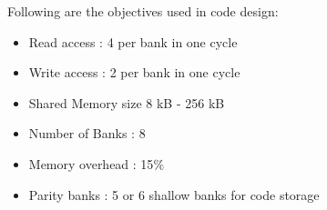 \documentclass{sig-alternate}
\begin{document}
Following are the objectives used in code design:
\begin{itemize}
\item Read access : 4 per bank in one cycle
\item Write access : 2 per bank in one cycle
\item Shared Memory size 8 kB - 256 kB
\item Number of Banks : 8
\item Memory overhead : 15$ \% $
\item Parity banks : 5 or 6 shallow banks for code storage
\end{itemize}



\newpage

%


\end{document}

